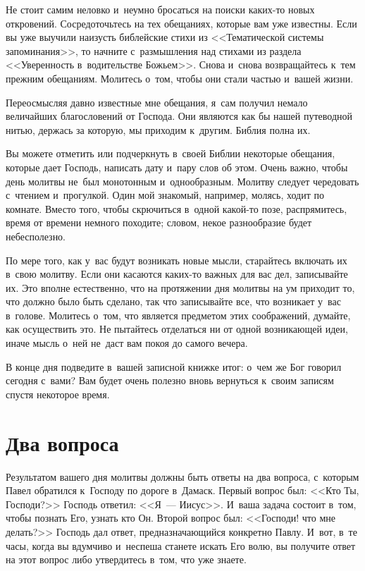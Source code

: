 \documentclass[12pt,article,a4paper,fittopage]{ncc}
\begin{document}
\begin{multicols}{2}
Не стоит самим неловко и~неумно бросаться на поиски каких-то новых откровений. Сосредоточьтесь на тех обещаниях, которые вам уже известны. Если вы уже выучили наизусть библейские стихи из <<Тематической системы запоминания>>, то начните с~размышления над стихами из раздела <<Уверенность в~водительстве Божьем>>. Снова и~снова возвращайтесь к~тем прежним обещаниям. Молитесь о~том, чтобы они стали частью и~вашей жизни.

Переосмысляя давно известные мне обещания, я~сам получил немало величайших благословений от Господа. Они являются как бы нашей путеводной нитью, держась за которую, мы приходим к~другим. Библия полна их.

Вы можете отметить или подчеркнуть в~своей Библии некоторые обещания, которые дает Господь, написать дату и~пару слов об этом.
Очень важно, чтобы день молитвы не~был монотонным и~однообразным. Молитву следует чередовать с~чтением и~прогулкой. Один мой знакомый, например, молясь, ходит по комнате. Вместо того, чтобы скрючиться в~одной какой-то позе, распрямитесь, время от времени немного походите; словом, некое разнообразие будет небесполезно. 

По мере того, как у~вас будут возникать новые мысли, старайтесь включать их в~свою молитву. Если они касаются каких-то важных для вас дел, записывайте их. Это вполне естественно, что на протяжении дня молитвы на ум приходит то, что должно было быть сделано, так что записывайте все, что возникает у~вас в~голове. Молитесь о~том, что является предметом этих соображений, думайте, как осуществить это. Не пытайтесь отделаться ни от одной возникающей идеи, иначе мысль о~ней не~даст вам покоя до самого вечера.

В конце дня подведите в~вашей записной книжке итог: о~чем же Бог говорил сегодня с~вами? Вам будет очень полезно вновь вернуться к~своим записям спустя некоторое время.

\section*{Два вопроса}

Результатом вашего дня молитвы должны быть ответы на два вопроса, с~которым Павел обратился к~Господу по дороге в~Дамаск. Первый вопрос был: <<Кто Ты, Господи?>> Господь ответил: <<Я~--- Иисус>>. И~ваша задача состоит в~том, чтобы познать Его, узнать кто Он. Второй вопрос был: <<Господи! что мне делать?>> Господь дал ответ, предназначающийся конкретно Павлу. И~вот, в~те часы, когда вы вдумчиво и~неспеша станете искать Его волю, вы получите ответ на этот вопрос либо утвердитесь в~том, что уже знаете.


\end{multicols}
\end{document}
